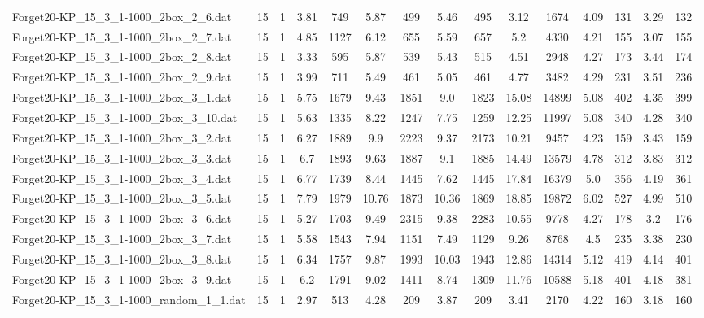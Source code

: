 \begin{table}[!ht]
{\begin{tabular}{lcccccccccccccc}
Forget20-KP\_15\_3\_1-1000\_2box\_2\_6.dat & 15 & 1 & 3.81 & 749 & 5.87 & 499 & 5.46 & 495 & 3.12 & 1674 & 4.09 & 131 & 3.29 & 132 \\
Forget20-KP\_15\_3\_1-1000\_2box\_2\_7.dat & 15 & 1 & 4.85 & 1127 & 6.12 & 655 & 5.59 & 657 & 5.2 & 4330 & 4.21 & 155 & 3.07 & 155 \\
Forget20-KP\_15\_3\_1-1000\_2box\_2\_8.dat & 15 & 1 & 3.33 & 595 & 5.87 & 539 & 5.43 & 515 & 4.51 & 2948 & 4.27 & 173 & 3.44 & 174 \\
Forget20-KP\_15\_3\_1-1000\_2box\_2\_9.dat & 15 & 1 & 3.99 & 711 & 5.49 & 461 & 5.05 & 461 & 4.77 & 3482 & 4.29 & 231 & 3.51 & 236 \\
Forget20-KP\_15\_3\_1-1000\_2box\_3\_1.dat & 15 & 1 & 5.75 & 1679 & 9.43 & 1851 & 9.0 & 1823 & 15.08 & 14899 & 5.08 & 402 & 4.35 & 399 \\
Forget20-KP\_15\_3\_1-1000\_2box\_3\_10.dat & 15 & 1 & 5.63 & 1335 & 8.22 & 1247 & 7.75 & 1259 & 12.25 & 11997 & 5.08 & 340 & 4.28 & 340 \\
Forget20-KP\_15\_3\_1-1000\_2box\_3\_2.dat & 15 & 1 & 6.27 & 1889 & 9.9 & 2223 & 9.37 & 2173 & 10.21 & 9457 & 4.23 & 159 & 3.43 & 159 \\
Forget20-KP\_15\_3\_1-1000\_2box\_3\_3.dat & 15 & 1 & 6.7 & 1893 & 9.63 & 1887 & 9.1 & 1885 & 14.49 & 13579 & 4.78 & 312 & 3.83 & 312 \\
Forget20-KP\_15\_3\_1-1000\_2box\_3\_4.dat & 15 & 1 & 6.77 & 1739 & 8.44 & 1445 & 7.62 & 1445 & 17.84 & 16379 & 5.0 & 356 & 4.19 & 361 \\
Forget20-KP\_15\_3\_1-1000\_2box\_3\_5.dat & 15 & 1 & 7.79 & 1979 & 10.76 & 1873 & 10.36 & 1869 & 18.85 & 19872 & 6.02 & 527 & 4.99 & 510 \\
Forget20-KP\_15\_3\_1-1000\_2box\_3\_6.dat & 15 & 1 & 5.27 & 1703 & 9.49 & 2315 & 9.38 & 2283 & 10.55 & 9778 & 4.27 & 178 & 3.2 & 176 \\
Forget20-KP\_15\_3\_1-1000\_2box\_3\_7.dat & 15 & 1 & 5.58 & 1543 & 7.94 & 1151 & 7.49 & 1129 & 9.26 & 8768 & 4.5 & 235 & 3.38 & 230 \\
Forget20-KP\_15\_3\_1-1000\_2box\_3\_8.dat & 15 & 1 & 6.34 & 1757 & 9.87 & 1993 & 10.03 & 1943 & 12.86 & 14314 & 5.12 & 419 & 4.14 & 401 \\
Forget20-KP\_15\_3\_1-1000\_2box\_3\_9.dat & 15 & 1 & 6.2 & 1791 & 9.02 & 1411 & 8.74 & 1309 & 11.76 & 10588 & 5.18 & 401 & 4.18 & 381 \\
Forget20-KP\_15\_3\_1-1000\_random\_1\_1.dat & 15 & 1 & 2.97 & 513 & 4.28 & 209 & 3.87 & 209 & 3.41 & 2170 & 4.22 & 160 & 3.18 & 160 \\

\end{tabular}}
\end{table}
